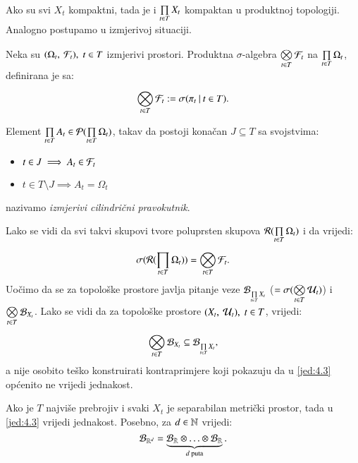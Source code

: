 Ako su svi $X_t$ kompaktni, tada je i $\prod\limits_{t \in T}^{} X_t$ kompaktan u produktnoj topologiji.
Analogno postupamo u izmjerivoj situaciji.

\begin{defn}    \label{defn:4.0-4}
    Neka su $(\Omega_t, \: \mathcal{F}_t), \; t \in T$ izmjerivi prostori.
    Produktna $\sigma$-algebra $\bigotimes\limits_{t \in T}^{} \mathcal{F}_t$ na $\prod\limits_{t \in T}^{} \Omega_t$, definirana je sa:
    \begin{equation}    \label{jed:4.1}
        \bigotimes\limits_{t \in T}^{} \mathcal{F}_t := \sigma({\pi_t} \: | \: {t \in T}).
    \end{equation}
\end{defn}

\begin{defn}    \label{defn:4.0-5}
    Element $\prod\limits_{t \in T}^{} A_t \in \mathcal{P}({\prod\limits_{t \in T}^{} \Omega_t})$, takav da postoji kona\v can $J \subseteq T$ sa svojstvima:
    \begin{itemize}[label=]
        \item $t \in J \implies A_t \in \mathcal{F}_t$
        \item $ t \in T \setminus J \implies A_t = \Omega_t $
    \end{itemize}
    nazivamo \emph{izmjerivi cilindri\v cni pravokutnik}.
\end{defn}

Lako se vidi da svi takvi skupovi tvore poluprsten skupova $\mathcal{R}({\prod\limits_{t \in T}^{} \Omega_t})$ i da vrijedi:
\begin{equation}    \label{jed:4.2}
    \sigma({\mathcal{R}({\prod\limits_{t \in T}^{} \Omega_t})}) = \bigotimes\limits_{t \in T}^{} \mathcal{F}_t.
\end{equation}
Uo\v cimo da se za topolo\v ske prostore javlja pitanje veze $\mathcal{B}_{\prod\limits_{t \in T}^{} X_t}$ ($= \sigma({\bigotimes\limits_{t \in T}^{} \mathcal{U}_t})$) i $\bigotimes\limits_{t \in T}^{} \mathcal{B}_{X_t}$.
Lako se vidi da za topolo\v ske prostore $(X_t, \: \mathcal{U}_t), \; t \in T$, vrijedi:
\begin{equation}    \label{jed:4.3}
    \bigotimes\limits_{t \in T}^{} \mathcal{B}_{X_t} \subseteq \mathcal{B}_{\prod\limits_{t \in T}^{} X_t},
\end{equation}
a nije osobito te\v sko konstruirati kontraprimjere koji pokazuju da u \eqref{jed:4.3} op\' cenito ne vrijedi jednakost.

\begin{zad} \label{zad:4.4}
    Ako je $T$ najvi\v se prebrojiv i svaki $X_t$ je separabilan metri\v cki prostor, tada u \eqref{jed:4.3} vrijedi jednakost.
    Posebno, za $d \in \mathbb{N}$ vrijedi:
    \begin{equation}    \label{jed:4.5}
        \mathcal{B}_{\mathbb{R}^d} = \underbrace{\mathcal{B}_{\mathbb{R}} \otimes \ldots \otimes \mathcal{B}_{\mathbb{R}}}_{d \textnormal{ puta}}.
    \end{equation}
\end{zad}

